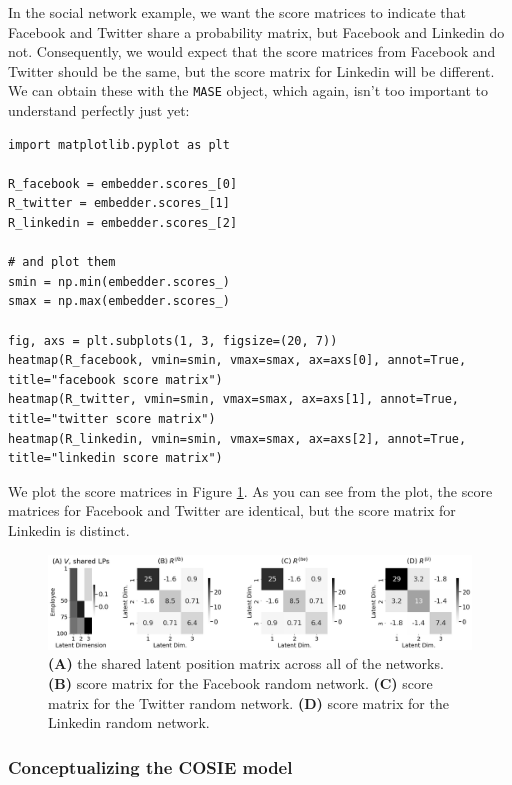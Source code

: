 In the social network example, we want the score matrices to indicate that Facebook and Twitter share a probability matrix, but Facebook and Linkedin do not. Consequently, we would expect that the score matrices from Facebook and Twitter should be the same, but the score matrix for Linkedin will be different. We can obtain these with the \texttt{MASE} object, which again, isn't too important to understand perfectly just yet:

\begin{lstlisting}[style=python]
import matplotlib.pyplot as plt

R_facebook = embedder.scores_[0]
R_twitter = embedder.scores_[1]
R_linkedin = embedder.scores_[2]

# and plot them
smin = np.min(embedder.scores_)
smax = np.max(embedder.scores_)

fig, axs = plt.subplots(1, 3, figsize=(20, 7))
heatmap(R_facebook, vmin=smin, vmax=smax, ax=axs[0], annot=True, title="facebook score matrix")
heatmap(R_twitter, vmin=smin, vmax=smax, ax=axs[1], annot=True, title="twitter score matrix")
heatmap(R_linkedin, vmin=smin, vmax=smax, ax=axs[2], annot=True, title="linkedin score matrix")
\end{lstlisting}
We plot the score matrices in Figure \ref{fig:ch5:scores}. As you can see from the plot, the score matrices for Facebook and Twitter are identical, but the score matrix for Linkedin is distinct.

\begin{figure}
    \centering
    \includegraphics[width=\linewidth]{representations/ch5/Images/scores.png}
    \caption[Score matrices for COSIE model]{\textbf{(A)} the shared latent position matrix across all of the networks. \textbf{(B)} score matrix for the Facebook random network. \textbf{(C)} score matrix for the Twitter random network. \textbf{(D)} score matrix for the Linkedin random network.}
    \label{fig:ch5:scores}
\end{figure}

\subsubsection{Conceptualizing the COSIE model}

